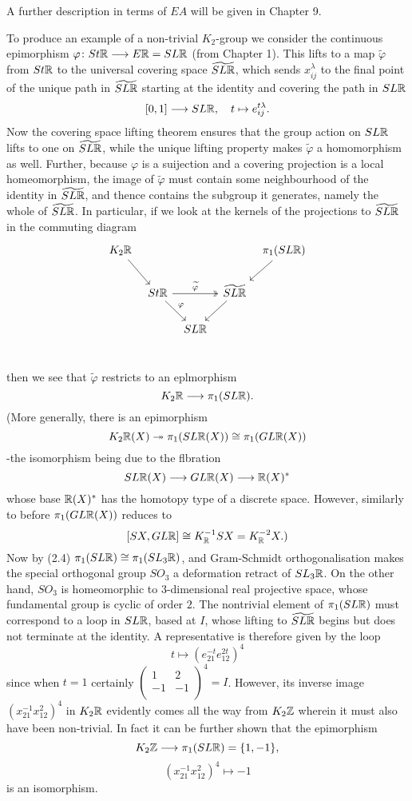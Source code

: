 A further description in terms of $EA$ will be given in Chapter 9. 

To produce an example of a non-trivial $K_2$-group we consider the continuous epimorphism  $\varphi\colon  St\mathbb{R} \longrightarrow E\mathbb{R} = SL\mathbb{R}$ (from Chapter 1). This lifts to a map $\widetilde{\varphi}$ from $St \mathbb{R}$ to the universal covering space $\widetilde{SL \mathbb{R}}$, which sends $x_{ij}^\lambda$ to the final point of the unique path in $\widetilde{SL \mathbb{R}}$ starting at the identity and covering the path in $SL\mathbb{R}$
\[[0, 1] \longrightarrow SL\mathbb{R}, \quad t\mapsto e_{ij}^{t\lambda} .\]
Now the covering space lifting theorem ensures that the group action on $SL\mathbb{R}$ lifts to one on $\widetilde{SL \mathbb{R}}$, while the unique lifting property makes $\widetilde{\varphi}$ a homomorphism as well. Further, because $\varphi$ is a suijection and a covering projection is a local homeomorphism, the image of $\widetilde{\varphi}$ must contain some neighbourhood of the identity in $\widetilde{SL \mathbb{R}}$, and thence contains the subgroup it generates,
namely the whole of $\widetilde{SL \mathbb{R}}$. In particular, if we look at the kernels of the projections to $\widetilde{SL \mathbb{R}}$ in the commuting diagram
\[
\begin{tikzcd}[column sep=tiny]
K_2\R \arrow{rd} & & & & \pi_1(SL \R) \arrow{dl}\\
 & St\R \arrow{rd}{\varphi} \arrow[two heads]{rr}{\widetilde{\varphi}} & & \widetilde{SL\R} \arrow{dl} & \\
 & & SL\R & &\\
\end{tikzcd}
\]

then we see that $\widetilde{\varphi}$ restricts to an eplmorphism
\[K_2 \mathbb{R}\longrightarrow \pi_1(SL\mathbb{R}).\]
(More generally, there is an epimorphism
\[K_2 \mathbb{R}(X)\twoheadrightarrow \pi_1(SL\mathbb{R}(X)) \cong \pi_1(GL\mathbb{R}(X))\]
-the isomorphism being due to the flbration
\[SL \mathbb{R}(X) \longrightarrow GL \mathbb{R}(X) \longrightarrow \mathbb{R}(X)^*\]
whose base $\mathbb{R}(X)^*$ has the homotopy type of a discrete space. However, similarly to before $\pi_1 (GL \mathbb{R}(X)) $ reduces to
\[[SX,GL\mathbb{R}] \cong K_{\mathbb{R}}^{-1}SX = K_{\mathbb{R}}^{-2}X.\text{)}\]
Now by (2.4) $\pi_1(SL \mathbb{R}) \cong \pi_1(SL_3 \mathbb{R})$, and Gram-Schmidt orthogonalisation makes the special orthogonal group $SO_3$ a deformation retract of $SL_3 \mathbb{R}$. On the other hand, $SO_3$ is homeomorphic to $3$-dimensional real projective space, whose fundamental group is cyclic of order $2$. The nontrivial element of $\pi_1 (SL \mathbb{R})$ must correspond to a loop in $SL \mathbb{R}$, based at $I$, whose lifting to $\widetilde{SL \mathbb{R}}$ begins but does not terminate at the identity. A representative is therefore given by the loop
\[t\mapsto (e_{21}^{-t}e_{12}^{2t})^4\]
since when $t=1$ certainly ${\begin{pmatrix}
  1 & 2\\
  -1& -1\\
\end{pmatrix}}^4=I$. However, its inverse image $(x_{21}^{-1}x_{12}^{2})^4$ in $K_2 \mathbb{R}$ 
evidently comes all the way from $K_2 \mathbb{Z}$ wherein it must also have been non-trivial. In fact it can be further shown that the epimorphism
\[K_2\mathbb{Z} \longrightarrow \pi_1(SL\mathbb{R}) = \{1,-1\},\]
\[(x_{21}^{-1}x_{12}^{2})^4\mapsto -1\]
is an isomorphism.


